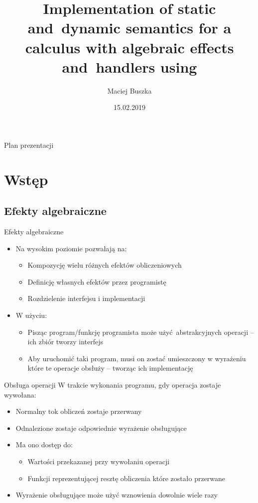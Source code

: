 \documentclass{beamer}
\title[A calculus with algebraic effects and~handlers]{Implementation of static and~dynamic semantics for a calculus with algebraic effects and~handlers using \Redex}
\author{Maciej Buszka}
\institute{Instytut Informatyki UWr}
\date{15.02.2019}
\begin{document}
\begin{frame}
	\titlepage
\end{frame}


\begin{frame}{Plan prezentacji}
	\tableofcontents
\end{frame}

\section{Wstęp}
\subsection{Efekty algebraiczne}
\begin{frame}{Efekty algebraiczne}
	\begin{itemize}
		\pause
		\item Na wysokim poziomie pozwalają na:
		\begin{itemize}
			\pause
			\item Kompozycję wielu różnych efektów obliczeniowych
			\pause
			\item Definicję własnych efektów przez programistę
			\pause
			\item Rozdzielenie interfejsu i implementacji
		\end{itemize}
		\pause
		\item W użyciu:
		\begin{itemize}
			\pause
			\item Pisząc program/funkcję programista może użyć abstrakcyjnych operacji -- ich zbiór tworzy interfejs
			\pause
			\item Aby uruchomić taki program, musi on zostać umieszczony w wyrażeniu które te operacje obsłuży -- tworząc ich implementację
		\end{itemize}
	\end{itemize}
\end{frame}

\begin{frame}{Obsługa operacji}
	\pause
	W trakcie wykonania programu, gdy operacja zostaje wywołana:
	\begin{itemize}
		\pause
		\item Normalny tok obliczeń zostaje przerwany
		\pause
		\item Odnalezione zostaje odpowiednie wyrażenie obsługujące
		\pause
		\item Ma ono dostęp do:
		\begin{itemize}
			\pause
			\item Wartości przekazanej przy wywołaniu operacji
			\pause
			\item Funkcji reprezentującej resztę obliczenia które zostało przerwane
		\end{itemize}
		\pause
		\item Wyrażenie obsługujące może użyć wznowienia dowolnie wiele razy
	\end{itemize}
\end{frame}
\end{document}

